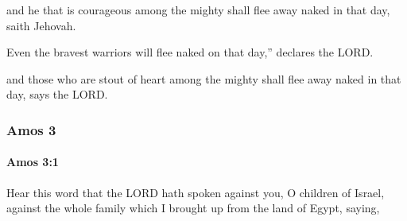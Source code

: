 			\begin{versebox}
					\item[BHS] 
					\item[LXX] 
					\item[ASV] and he that is courageous among the mighty shall flee away naked in that day, saith Jehovah.
					\item[NIV] Even the bravest warriors will flee naked on that day,” declares the LORD.
					\item[NRSV] and those who are stout of heart among the mighty shall flee away naked in that day, says the LORD.
			\end{versebox}
	\subsubsection{Amos 3} %
		\label{AMOS-3}

		\paragraph{Amos 3:1} %
			\label{AMOS-3-1}

			Hear this word that the LORD hath spoken against you, O children of Israel, against the whole family which I brought up from the land of Egypt, saying,

